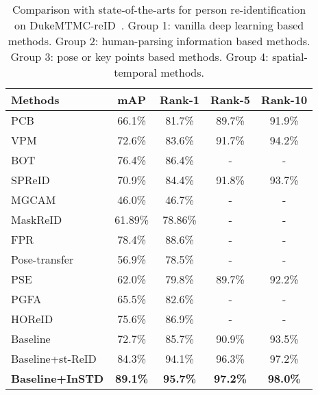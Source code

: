 \documentclass[10pt,twocolumn,letterpaper]{article}
\begin{document}
\begin{table}[t]
\begin{center}
\setlength{\tabcolsep}{1mm}
{
\begin{tabular}{l | c | c | c | c}
\hline
\bf{Methods} & \bf{mAP} & \bf{Rank-1} & \bf{Rank-5} & \bf{Rank-10}  \\
\hline


PCB~\cite{2017Beyond} & 66.1\% & 81.7\% & 89.7\% & 91.9\% \\
VPM~\cite{Perceive2020Perceive} & 72.6\% & 83.6\% & 91.7\% & 94.2\% \\
BOT~\cite{Luo2019Bag} & 76.4\% & 86.4\% & - & - \\


\hline
SPReID~\cite{Kalayeh2018Human} & 70.9\% & 84.4\% & 91.8\% & 93.7\% \\ 
MGCAM~\cite{Song2018Mask} & 46.0\% & 46.7\% & - & - \\
MaskReID~\cite{2018MaskReID} &61.89\% & 78.86\% & - & - \\
FPR~\cite{2020Foreground} & 78.4\% & 88.6\% & - & - \\

\hline
Pose-transfer~\cite{2018Pose} & 56.9\% & 78.5\% & - & - \\
PSE~\cite{2017A} & 62.0\% & 79.8\% & 89.7\% & 92.2\% \\
PGFA~\cite{2019Pose} & 65.5\% & 82.6\% & - & - \\
HOReID~\cite{Wang2020High} & 75.6\% & 86.9\% & - & - \\

\hline
Baseline & 72.7\% & 85.7\% & 90.9\% & 93.5\% \\
Baseline+st-ReID~\cite{guangcong2019aaai} & 84.3\% & 94.1\% & 96.3\% &97.2\% \\



\textbf{Baseline+InSTD} & \bf{89.1\%} & \bf{95.7\%}  & \bf{97.2\%} & \bf{98.0\%} \\
\hline
\end{tabular}}
\end{center}
\caption{Comparison with state-of-the-arts for person re-identification on DukeMTMC-reID~\cite{Ergys2016Performance}. Group 1: vanilla deep learning based methods. Group 2: human-parsing information based methods. Group 3: pose or key points based methods. Group 4: spatial-temporal methods.}
\label{tab:duke}
\vspace{-0.3cm}
\end{table}
\end{document}
